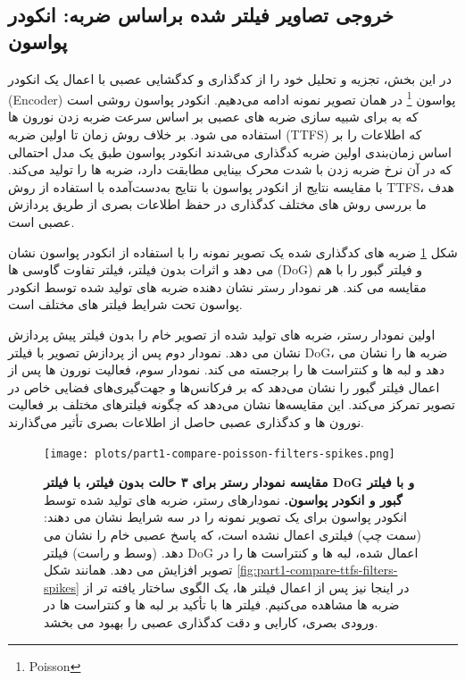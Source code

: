         \subsection{خروجی ﺗﺼﺎﻭﯾﺮ ﻓﯿﻠﺘﺮ ﺷﺪﻩ ﺑﺮﺍﺳﺎﺱ ﺿﺮبه: انکودر پواسون}
        در این بخش، تجزیه و تحلیل خود را از کدگذاری و کدگشایی عصبی با اعمال یک انکودر
        (Encoder)
        پواسون
        \footnote{Poisson}
        در همان تصویر نمونه ادامه می‌دهیم. انکودر پواسون روشی است که به برای شبیه سازی ضربه های عصبی بر اساس سرعت ضربه زدن نورون ها استفاده می شود. بر خلاف روش زمان تا اولین ضربه 
        (TTFS) 
        که اطلاعات را بر اساس زمان‌بندی اولین ضربه کدگذاری می‌شدند انکودر پواسون طبق یک مدل احتمالی که در آن نرخ ضربه زدن با شدت محرک بینایی مطابقت دارد، ضربه ها را تولید می‌کند. با مقایسه نتایج از انکودر پواسون با نتایج به‌دست‌آمده با استفاده از روش 
        TTFS، 
        هدف ما بررسی روش های مختلف کدگذاری در حفظ اطلاعات بصری از طریق پردازش عصبی است.

        شکل
        \ref{fig:part1-compare-poisson-filters-spikes}
        ضربه های کدگذاری شده یک تصویر نمونه را با استفاده از انکودر پواسون نشان می دهد و اثرات بدون فیلتر، فیلتر تفاوت گاوسی ها 
        (DoG)
        و فیلتر گبور را با هم مقایسه می کند. هر نمودار رستر نشان دهنده ضربه های تولید شده توسط انکودر پواسون تحت شرایط فیلتر های مختلف است.

        اولین نمودار رستر، ضربه های تولید شده از تصویر خام را بدون فیلتر پیش پردازش نشان می دهد. نمودار دوم پس از پردازش تصویر با فیلتر DoG، 
        ضربه ها را نشان می دهد و لبه ها و کنتراست ها را برجسته می کند. نمودار سوم، فعالیت نورون ها پس از اعمال فیلتر گبور را نشان می‌دهد که بر فرکانس‌ها و جهت‌گیری‌های فضایی خاص در تصویر تمرکز می‌کند. این مقایسه‌ها نشان می‌دهد که چگونه فیلترهای مختلف بر فعالیت نورون ها و کدگذاری عصبی حاصل از اطلاعات بصری تأثیر می‌گذارند.

        \begin{figure}[!ht]
            \centering
            \texttt{[image: plots/part1-compare-poisson-filters-spikes.png]} 
            \captionsetup{width=.9\linewidth}
            \caption{\textbf{مقایسه نمودار رستر برای ۳ حالت بدون فیلتر، با فیلتر 
            DoG 
            و با فیلتر گبور و انکودر پواسون.} 
            نمودارهای رستر، ضربه های تولید شده توسط انکودر پواسون برای یک تصویر نمونه را در سه شرایط نشان می دهند: 
            (سمت چپ) 
            فیلتری اعمال نشده است، که پاسخ عصبی خام را نشان می دهد. 
            (وسط و راست) 
            فیلتر 
            DoG 
            اعمال شده، لبه ها و کنتراست ها را در تصویر افزایش می دهد.
            همانند شکل 
            \ref{fig:part1-compare-ttfs-filters-spikes} 
            در اینجا نیز پس از اعمال فیلتر ها، یک الگوی ساختار یافته تر از ضربه ها مشاهده می‌کنیم. فیلتر ها
            با تأکید بر لبه ها و کنتراست ها در ورودی بصری، کارایی و دقت کدگذاری عصبی را بهبود می بخشد.
            }
            \label{fig:part1-compare-poisson-filters-spikes}
        \end{figure}

